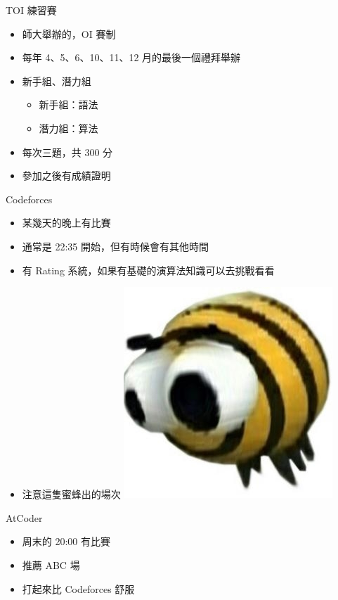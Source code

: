 \documentclass[aspectratio=169]{beamer}
\begin{document}
	\begin{frame}{TOI 練習賽}
		\begin{itemize}
			\item 師大舉辦的，OI 賽制
			\item 每年 4、5、6、10、11、12 月的最後一個禮拜舉辦
			\item 新手組、潛力組
				\begin{itemize}
					\item 新手組：語法
					\item 潛力組：算法
				\end{itemize}
			\item 每次三題，共 300 分
			\item 參加之後有成績證明
		\end{itemize}
	\end{frame}

	\begin{frame}{Codeforces}
		\begin{itemize}
			\item 某幾天的晚上有比賽
			\item 通常是 22:35 開始，但有時候會有其他時間
			\item 有 Rating 系統，如果有基礎的演算法知識可以去挑戰看看
			\item 注意這隻蜜蜂出的場次
			\includegraphics[height=0.4\textheight]{src/antontrygubO_o.jpg}
		\end{itemize}
	\end{frame}

	\begin{frame}{AtCoder}
		\begin{itemize}
			\item 周末的 20:00 有比賽
			\item 推薦 ABC 場
			\item 打起來比 Codeforces 舒服
		\end{itemize}
	\end{frame}
\end{document}

